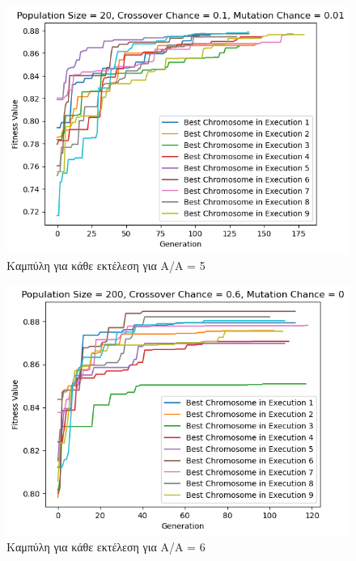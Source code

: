 \documentclass[12pt,a4paper]{article}
\begin{document}
\begin{figure}[H]
	\includegraphics[width=\textwidth]{Figures/10. All for AA = 5.png}
	\caption{Καμπύλη για κάθε εκτέλεση για A/A = 5}
\end{figure}

\begin{figure}[H]
	\includegraphics[width=\textwidth]{Figures/12. All for AA = 6.png}
	\caption{Καμπύλη για κάθε εκτέλεση για A/A = 6}
\end{figure}
\end{document}
